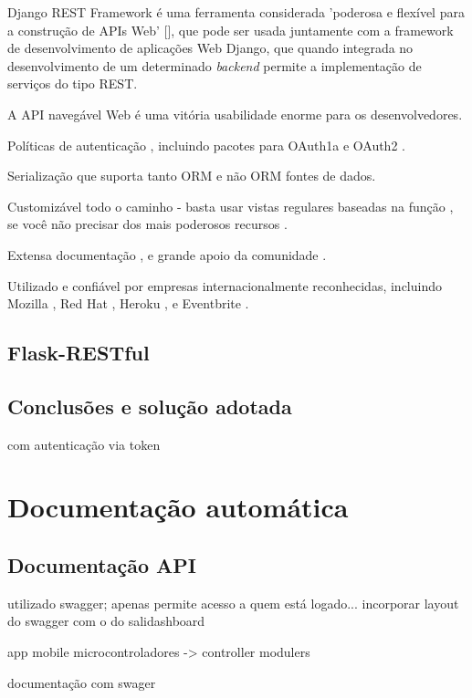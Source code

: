 Django REST Framework é uma ferramenta considerada 'poderosa e flexível para a construção de APIs Web' [], que pode ser usada juntamente com a framework de desenvolvimento de aplicações Web Django, que quando integrada no desenvolvimento de um determinado \textit{backend} permite a implementação de serviços do tipo REST.



A API navegável Web é uma vitória usabilidade enorme para os desenvolvedores.

Políticas de autenticação , incluindo pacotes para OAuth1a e OAuth2 .

Serialização que suporta tanto ORM e não ORM fontes de dados.

Customizável todo o caminho - basta usar vistas regulares baseadas na função , se você não  precisar dos mais poderosos recursos .

Extensa documentação , e grande apoio da comunidade .

Utilizado e confiável por empresas internacionalmente reconhecidas, incluindo Mozilla , 
Red Hat , Heroku , e Eventbrite .




\subsection{Flask-RESTful}

\subsection{Conclusões e solução adotada}




com autenticação via token 


\section{Documentação automática}

\subsection{Documentação API}

utilizado swagger; apenas permite acesso a quem está logado... incorporar layout do swagger com o do salidashboard




app mobile
microcontroladores -> controller modulers 


documentação com swager 





